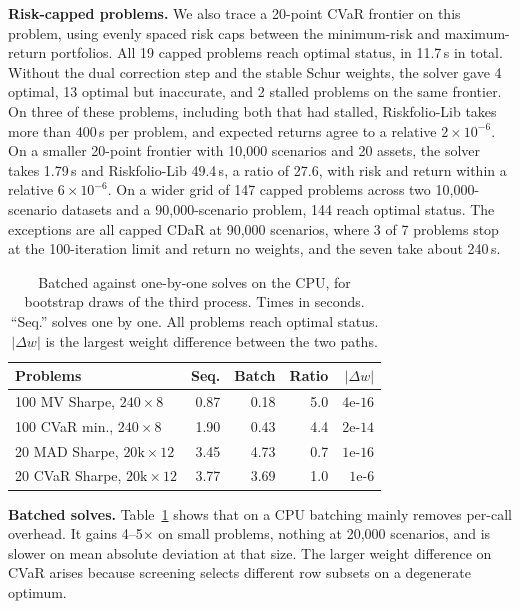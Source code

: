 \documentclass[10pt,twocolumn,letterpaper]{article}
\begin{document}
\textbf{Risk-capped problems.} We also trace a 20-point CVaR frontier on this problem, using evenly spaced risk caps between the minimum-risk and maximum-return portfolios. All 19 capped problems reach optimal status, in 11.7\,s in total. Without the dual correction step and the stable Schur weights, the solver gave 4 optimal, 13 optimal but inaccurate, and 2 stalled problems on the same frontier. On three of these problems, including both that had stalled, Riskfolio-Lib takes more than 400\,s per problem, and expected returns agree to a relative $2 \times 10^{-6}$. On a smaller 20-point frontier with 10,000 scenarios and 20 assets, the solver takes 1.79\,s and Riskfolio-Lib 49.4\,s, a ratio of 27.6, with risk and return within a relative $6 \times 10^{-6}$. On a wider grid of 147 capped problems across two 10,000-scenario datasets and a 90,000-scenario problem, 144 reach optimal status. The exceptions are all capped CDaR at 90,000 scenarios, where 3 of 7 problems stop at the 100-iteration limit and return no weights, and the seven take about 240\,s.

\begin{table}[h]
\centering
\caption{Batched against one-by-one solves on the CPU, for bootstrap draws of the third process. Times in seconds. ``Seq.'' solves one by one. All problems reach optimal status. $|\Delta w|$ is the largest weight difference between the two paths.}
\label{tab:batch}
\footnotesize
\setlength{\tabcolsep}{3pt}
\begin{tabular}{lrrrr}
\toprule
Problems & Seq. & Batch & Ratio & $|\Delta w|$ \\
\midrule
100 MV Sharpe, $240 \times 8$ & 0.87 & 0.18 & 5.0 & $4\text{e-}16$ \\
100 CVaR min., $240 \times 8$ & 1.90 & 0.43 & 4.4 & $2\text{e-}14$ \\
20 MAD Sharpe, $20\text{k} \times 12$ & 3.45 & 4.73 & 0.7 & $1\text{e-}16$ \\
20 CVaR Sharpe, $20\text{k} \times 12$ & 3.77 & 3.69 & 1.0 & $1\text{e-}6$ \\
\bottomrule
\end{tabular}
\end{table}

\textbf{Batched solves.} Table~\ref{tab:batch} shows that on a CPU batching mainly removes per-call overhead. It gains 4--5$\times$ on small problems, nothing at 20,000 scenarios, and is slower on mean absolute deviation at that size. The larger weight difference on CVaR arises because screening selects different row subsets on a degenerate optimum.
\end{document}
